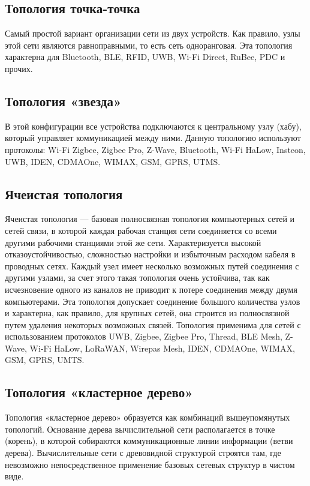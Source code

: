 \documentclass[14pt, a4paper]{extreport}
\begin{document}
\subsection{Топология точка-точка}
Самый простой вариант организации сети из двух устройств. Как правило, узлы этой сети являются равноправными, то есть сеть одноранговая.
Эта топология характерна для Bluetooth, BLE, RFID, UWB, Wi-Fi Direct, RuBee, PDC и прочих.

\subsection{Топология «звезда»}
В этой конфигурации все устройства подключаются к центральному узлу (хабу), который управляет коммуникацией между ними.
Данную топологию используют протоколы: Wi-Fi Zigbee, Zigbee Pro, Z-Wave, Bluetooth, Wi-Fi HaLow, Insteon, UWB, IDEN, CDMAOne, WIMAX, GSM, GPRS, UTMS.

\subsection{Ячеистая топология}
Ячеистая топология — базовая полносвязная топология компьютерных сетей и сетей связи, в которой каждая рабочая станция сети соединяется со всеми другими рабочими станциями этой же сети. Характеризуется высокой отказоустойчивостью, сложностью настройки и избыточным расходом кабеля в проводных сетях. Каждый узел имеет несколько возможных путей соединения с другими узлами, за счет этого такая топология очень устойчива, так как исчезновение одного из каналов не приводит к потере соединения между двумя компьютерами. Эта топология допускает соединение большого количества узлов и характерна, как правило, для крупных сетей, она строится из полносвязной путем удаления некоторых возможных связей.
Топология применима для сетей с использованием протоколов UWB, Zigbee, Zigbee Pro, Thread, BLE Mesh, Z-Wave, Wi-Fi HaLow, LoRaWAN, Wirepas Mesh, IDEN, CDMAOne, WIMAX, GSM, GPRS, UMTS.

\subsection{Топология «кластерное дерево»}
Топология «кластерное дерево» образуется как комбинаций вышеупомянутых топологий. Основание дерева вычислительной сети располагается в точке (корень), в которой собираются
коммуникационные линии информации (ветви дерева). Вычислительные сети с древовидной структурой строятся там, где невозможно непосредственное применение базовых сетевых структур в
чистом виде.
\end{document}
